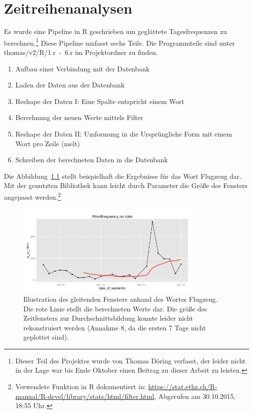\chapter{Zeitreihenanalysen}
Es wurde eine Pipeline in R geschrieben um geglättete Tagesfrequenzen zu berechnen.\footnote{Dieser Teil des Projektes wurde von Thomas Döring verfasst, der leider nicht in der Lage war bis Ende Oktober einen Beitrag zu dieser Arbeit zu leisten.} Diese Pipeline umfasst sechs Teile. Die Programmteile sind unter thomas/v2/R/1.r~-~6.r im Projektordner zu finden.
\begin{enumerate}
\item Aufbau einer Verbindung mit der Datenbank
\item Laden der Daten aus der Datenbank
\item Reshape der Daten I: Eine Spalte entspricht einem Wort
\item Berechnung der neuen Werte mittels Filter
\item Reshape der Daten II: Umformung in die Ursprüngliche Form mit einem Wort pro Zeile (melt)
\item Schreiben der berechneten Daten in die Datenbank 
\end{enumerate}
Die Abbildung~\ref{pic.time_airplane} stellt beispielhaft die Ergebnisse für das Wort Flugzeug dar. Mit der genutzten Bibliothek kann leicht durch Parameter die Größe des Fensters angepasst werden.\footnote{Verwendete Funktion in R dokumentiert in: \url{https://stat.ethz.ch/R-manual/R-devel/library/stats/html/filter.html}, Abgerufen am 30.10.2015, 18:55 Uhr.}
\begin{figure}[h!]
    \centering
    \includegraphics[width=0.82\textwidth]{pictures/timeFlugzeug.png}
    \caption{Illustration des gleitenden Fensters anhand des Wortes Flugzeug. Die rote Linie stellt die berechneten Werte dar. Die größe des Zeitfensters zur Durchschnittsbildung konnte leider nicht rekonstruiert werden (Annahme 8, da die ersten 7 Tage nicht geplottet sind). }\label{pic.time_airplane}
\end{figure}

